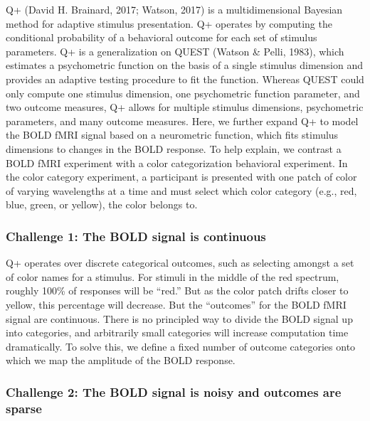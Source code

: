 \documentclass[
  english,
  man,floatsintext]{apa6}
\begin{document}
Q+ (David H. Brainard, 2017; Watson, 2017) is a multidimensional Bayesian method for adaptive stimulus presentation. Q+ operates by computing the conditional probability of a behavioral outcome for each set of stimulus parameters. Q+ is a generalization on QUEST (Watson \& Pelli, 1983), which estimates a psychometric function on the basis of a single stimulus dimension and provides an adaptive testing procedure to fit the function. Whereas QUEST could only compute one stimulus dimension, one psychometric function parameter, and two outcome measures, Q+ allows for multiple stimulus dimensions, psychometric parameters, and many outcome measures. Here, we further expand Q+ to model the BOLD fMRI signal based on a neurometric function, which fits stimulus dimensions to changes in the BOLD response. To help explain, we contrast a BOLD fMRI experiment with a color categorization behavioral experiment. In the color category experiment, a participant is presented with one patch of color of varying wavelengths at a time and must select which color category (e.g., red, blue, green, or yellow), the color belongs to.

\hypertarget{challenge-1-the-bold-signal-is-continuous}{%
\subsubsection{Challenge 1: The BOLD signal is continuous}\label{challenge-1-the-bold-signal-is-continuous}}

Q+ operates over discrete categorical outcomes, such as selecting amongst a set of color names for a stimulus. For stimuli in the middle of the red spectrum, roughly 100\% of responses will be \enquote{red.} But as the color patch drifts closer to yellow, this percentage will decrease. But the \enquote{outcomes} for the BOLD fMRI signal are continuous. There is no principled way to divide the BOLD signal up into categories, and arbitrarily small categories will increase computation time dramatically. To solve this, we define a fixed number of outcome categories onto which we map the amplitude of the BOLD response.

\hypertarget{challenge-2-the-bold-signal-is-noisy-and-outcomes-are-sparse}{%
\subsubsection{Challenge 2: The BOLD signal is noisy and outcomes are sparse}\label{challenge-2-the-bold-signal-is-noisy-and-outcomes-are-sparse}}
\end{document}
